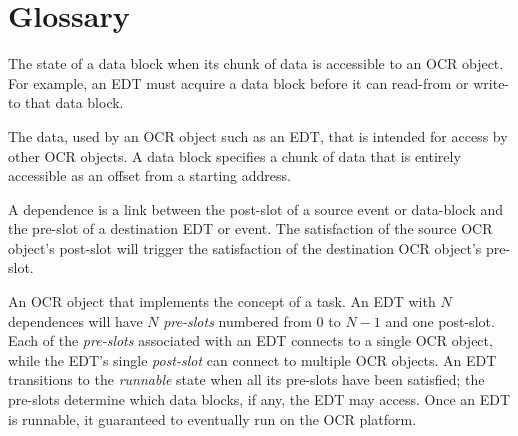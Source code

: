 %
%

%
\section{Glossary}
\label{sec:Glossary}
\glossarydefstart
The state of a data block when its chunk of data is accessible to an
OCR object. For example, an EDT must acquire a data block before it
can read-from or write-to that data block.
\glossarydefend

\glossarydefstart
The data, used by an OCR object such as an EDT, that is intended for
access by other OCR objects. A data block specifies
a chunk of data that is entirely accessible as an offset from a starting address.
\glossarydefend

\glossarydefstart
A dependence is a link between the post-slot of a source event or
data-block and the pre-slot of a destination EDT or event. The
satisfaction of the source OCR object's post-slot will trigger the
satisfaction of the destination OCR object's pre-slot.
\glossarydefend

\glossarydefstart
An OCR object that implements the concept of a task. An EDT with $N$
dependences will have $N$ \emph{pre-slots} numbered from $0$ to $N-1$
and one post-slot.
Each of the \emph{pre-slots} associated with an EDT connects to a
single OCR object, while the EDT’s single \emph{post-slot} can connect
to multiple OCR objects. An EDT transitions to the \emph{runnable} state when all its
pre-slots have been satisfied; the pre-slots determine which
data blocks, if any, the EDT may access.  Once an EDT is runnable, it guaranteed to
eventually run on the OCR platform.
\glossarydefend

